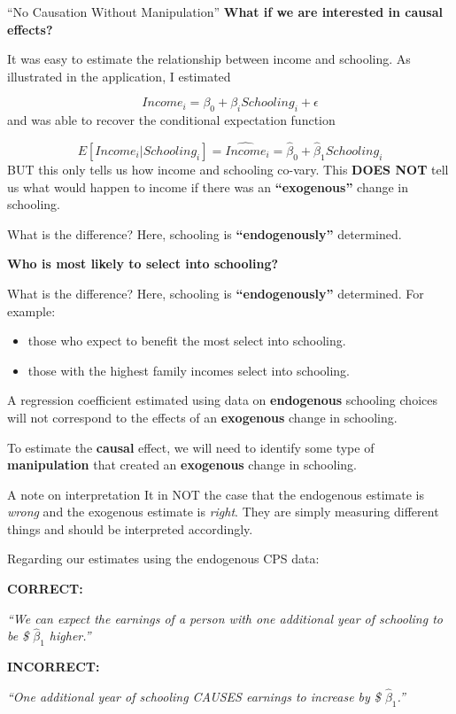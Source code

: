 \documentclass[
  ignorenonframetext,
]{beamer}
\begin{document}
\begin{frame}{``No Causation Without Manipulation''}
\protect\hypertarget{no-causation-without-manipulation}{}
\textbf{What if we are interested in causal effects?}

It was easy to estimate the relationship between income and schooling.
As illustrated in the application, I estimated

\[
Income_i=\beta_0+\beta_i Schooling_i+\epsilon 
\] and was able to recover the conditional expectation function

\[
E[Income_i|Schooling_i]=\hat{Income}_i=\hat{\beta}_0+\hat{\beta}_1Schooling_i 
\] BUT this only tells us how income and schooling co-vary. This
\textbf{DOES NOT} tell us what would happen to income if there was an
\textbf{``exogenous''} change in schooling.
\end{frame}

\begin{frame}{What is the difference?}
\protect\hypertarget{what-is-the-difference}{}
Here, schooling is \textbf{``endogenously''} determined.

\textbf{Who is most likely to select into schooling?}
\end{frame}

\begin{frame}{What is the difference?}
\protect\hypertarget{what-is-the-difference-1}{}
Here, schooling is \textbf{``endogenously''} determined. For example:

\begin{itemize}
\item
  those who expect to benefit the most select into schooling.
\item
  those with the highest family incomes select into schooling.
\end{itemize}

A regression coefficient estimated using data on \textbf{endogenous}
schooling choices will not correspond to the effects of an
\textbf{exogenous} change in schooling.

To estimate the \textbf{causal} effect, we will need to identify some
type of \textbf{manipulation} that created an \textbf{exogenous} change
in schooling.
\end{frame}

\begin{frame}{A note on interpretation}
\protect\hypertarget{a-note-on-interpretation}{}
It in NOT the case that the endogenous estimate is \textit{wrong} and
the exogenous estimate is \textit{right}. They are simply measuring
different things and should be interpreted accordingly.

Regarding our estimates using the endogenous CPS data:

\textbf{CORRECT:}

\emph{``We can expect the earnings of a person with one additional year
of schooling to be \$ \(\hat{\beta}_1\) higher.''}

\textbf{INCORRECT:}

\emph{``One additional year of schooling CAUSES earnings to increase by
\$ \(\hat{\beta}_1\).''}
\end{frame}
\end{document}
